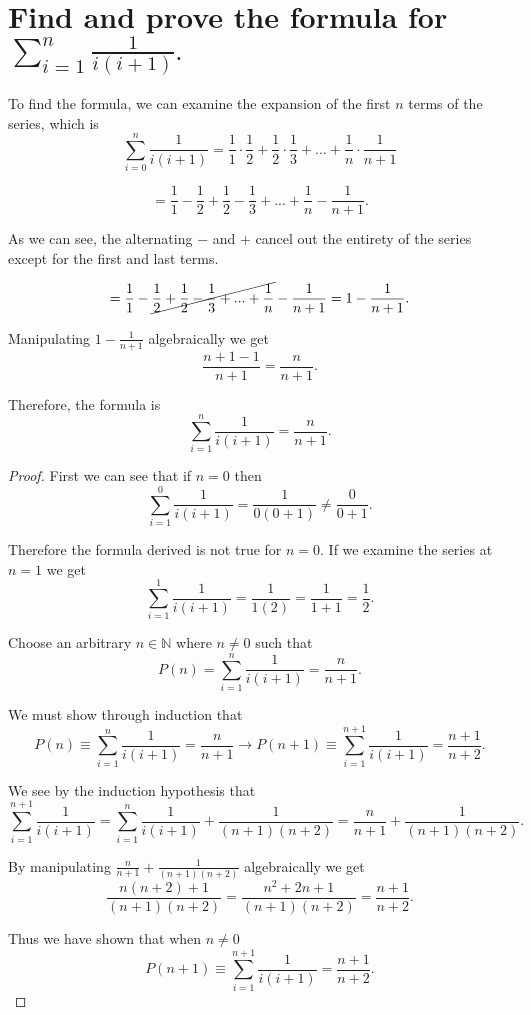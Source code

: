\documentclass[11pt]{article}
\begin{document}
\section{Find and prove the formula for $\sum_{i=1}^{n}\frac{1}{i(i+1)}.$}

To find the formula, we can examine the expansion of the first $n$ terms of the series, which is $$\sum_{i=0}^{n}\frac{1}{i(i+1)}=\frac{1}{1}\cdot\frac{1}{2}+\frac{1}{2}\cdot\frac{1}{3}+...+\frac{1}{n}\cdot\frac{1}{n+1}$$

$$=\frac{1}{1}-\frac{1}{2}+\frac{1}{2}-\frac{1}{3}+...+\frac{1}{n}-\frac{1}{n+1}.$$

As we can see, the alternating $-$ and $+$ cancel out the entirety of the series except for the first and last terms.

$$=\frac{1}{1}-\cancel{\frac{1}{2}+\frac{1}{2}-\frac{1}{3}+...+\frac{1}{n}}-\frac{1}{n+1}=1-\frac{1}{n+1}.$$

Manipulating $1-\frac{1}{n+1}$ algebraically we get $$\frac{n+1-1}{n+1}=\frac{n}{n+1}.$$

Therefore, the formula is $$\sum_{i=1}^{n}\frac{1}{i(i+1)}=\frac{n}{n+1}.$$

\begin{proof}

First we can see that if $n=0$ then $$\sum_{i=1}^{0}\frac{1}{i(i+1)}=\frac{1}{0(0+1)}\neq\frac{0}{0+1}.$$

Therefore the formula derived is not true for $n=0$. If we examine the series at $n=1$ we get $$\sum_{i=1}^{1}\frac{1}{i(i+1)}=\frac{1}{1(2)}=\frac{1}{1+1}=\frac{1}{2}.$$

Choose an arbitrary $n\in\mathbb{N}$ where $n\neq 0$ such that $$P(n)=\sum_{i=1}^{n}\frac{1}{i(i+1)}=\frac{n}{n+1}.$$

We must show through induction that $$P(n)\equiv\sum_{i=1}^{n}\frac{1}{i(i+1)}=\frac{n}{n+1}\longrightarrow P(n+1)\equiv\sum_{i=1}^{n+1}\frac{1}{i(i+1)}=\frac{n+1}{n+2}.$$

We see by the induction hypothesis that $$\sum_{i=1}^{n+1}\frac{1}{i(i+1)}=\sum_{i=1}^{n}\frac{1}{i(i+1)}+\frac{1}{(n+1)(n+2)}=\frac{n}{n+1}+\frac{1}{(n+1)(n+2)}.$$

By manipulating $\frac{n}{n+1}+\frac{1}{(n+1)(n+2)}$ algebraically we get $$\frac{n(n+2)+1}{(n+1)(n+2)}=\frac{n^{2}+2n+1}{(n+1)(n+2)}=\frac{n+1}{n+2}.$$

Thus we have shown that when $n\neq0$ $$P(n+1)\equiv\sum_{i=1}^{n+1}\frac{1}{i(i+1)}=\frac{n+1}{n+2}.$$

\end{proof}
\end{document}
